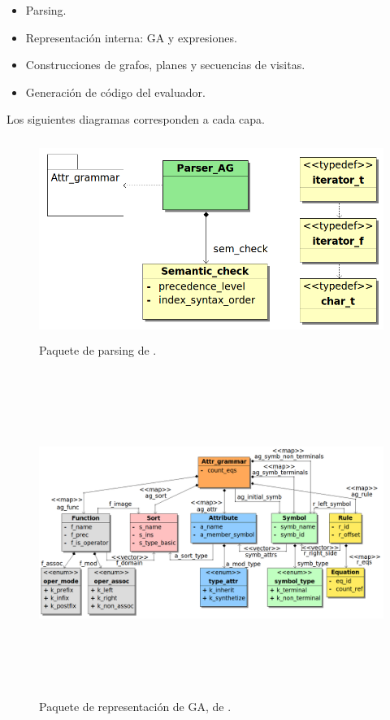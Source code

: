 \begin{itemize}
\item Parsing.
\item Representación interna: GA y expresiones.
\item Construcciones de grafos, planes y secuencias de visitas.
\item Generación de código del evaluador.
\end{itemize}

Los siguientes diagramas corresponden a cada capa.

\begin{figure}[!ht]\centering
\includegraphics[width=350pt, height=184pt]{diagramas/Parser.png}
\caption{\label{fig:dia-parser}Paquete de parsing de \maggen.}
\end{figure}

\begin{figure}[!ht]\centering
\includegraphics[width=605pt, height=300pt, angle=90]{diagramas/Attr_grammar.png}
\caption{\label{fig:dia-grammar}Paquete de representación de GA, de \maggen.}
\end{figure}

